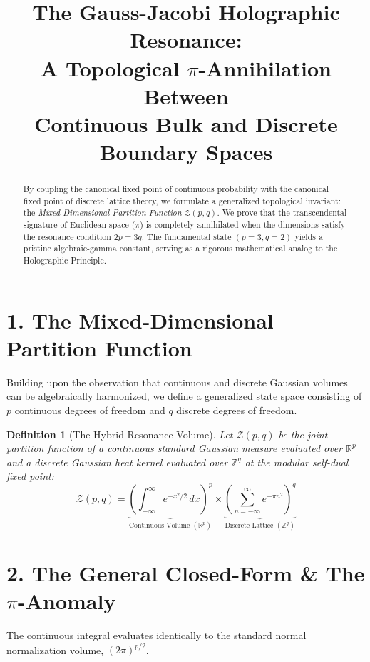 \documentclass[12pt]{article}
\newtheorem{definition}{Definition}
\begin{document}
\title{\textbf{The Gauss-Jacobi Holographic Resonance: \\ A Topological $\pi$-Annihilation Between \\ Continuous Bulk and Discrete Boundary Spaces}}
\author{}
\date{}
\maketitle

\begin{abstract}
\noindent By coupling the canonical fixed point of continuous probability with the canonical fixed point of discrete lattice theory, we formulate a generalized topological invariant: the \textit{Mixed-Dimensional Partition Function} $\mathcal{Z}(p, q)$. We prove that the transcendental signature of Euclidean space ($\pi$) is completely annihilated when the dimensions satisfy the resonance condition $2p = 3q$. The fundamental state $(p=3, q=2)$ yields a pristine algebraic-gamma constant, serving as a rigorous mathematical analog to the Holographic Principle.
\end{abstract}

\vspace{0.5cm}

\section*{1. The Mixed-Dimensional Partition Function}
Building upon the observation that continuous and discrete Gaussian volumes can be algebraically harmonized, we define a generalized state space consisting of $p$ continuous degrees of freedom and $q$ discrete degrees of freedom.

\begin{definition}[The Hybrid Resonance Volume]
Let $\mathcal{Z}(p, q)$ be the joint partition function of a continuous standard Gaussian measure evaluated over $\mathbb{R}^p$ and a discrete Gaussian heat kernel evaluated over $\mathbb{Z}^q$ at the modular self-dual fixed point:
\begin{equation}
    \mathcal{Z}(p, q) = \underbrace{\left( \int_{-\infty}^\infty e^{-x^2/2} \, dx \right)^p}_{\text{Continuous Volume } (\mathbb{R}^p)} \times \underbrace{\left( \sum_{n=-\infty}^\infty e^{-\pi n^2} \right)^q}_{\text{Discrete Lattice } (\mathbb{Z}^q)}
\end{equation}
\end{definition}

\section*{2. The General Closed-Form \& The $\pi$-Anomaly}
The continuous integral evaluates identically to the standard normal normalization volume, $(2\pi)^{p/2}$.
\end{document}
